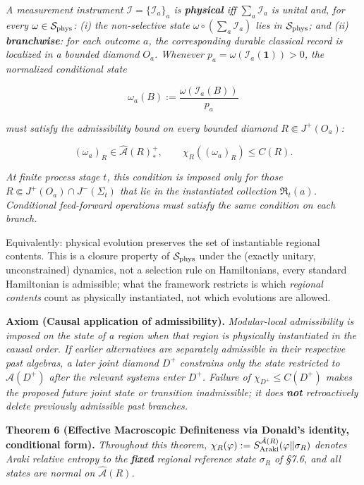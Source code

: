 \documentclass[11pt,a4paper]{article}
\begin{document}
\emph{A measurement instrument $\mathcal{I} = \{\mathcal{I}_a\}_a$ is \textbf{physical} iff $\sum_a \mathcal{I}_a$ is unital and, for every $\omega \in \mathcal{S}_{\rm phys}$:}
\emph{(i) the non-selective state $\omega \circ (\sum_a \mathcal{I}_a)$ lies in $\mathcal{S}_{\rm phys}$; and}
\emph{(ii) \textbf{branchwise}: for each outcome $a$, the corresponding durable classical record is localized in a bounded diamond $O_a$. Whenever $p_a = \omega(\mathcal{I}_a(\mathbf{1})) > 0$, the normalized conditional state}

\[
\omega_a(B) := \frac{\omega(\mathcal{I}_a(B))}{p_a}
\]

\emph{must satisfy the admissibility bound on every bounded diamond $R \Subset J^+(O_a)$:}

\[
(\omega_a)_R \in \hat{\mathcal{A}}(R)_*^+, \qquad \chi_R((\omega_a)_R) \le C(R).
\]

\emph{At finite process stage $t$, this condition is imposed only for those $R \Subset J^+(O_a) \cap J^-(\Sigma_t)$ that lie in the instantiated collection $\mathfrak{R}_t(a)$. Conditional feed-forward operations must satisfy the same condition on each branch.}

Equivalently: physical evolution preserves the set of instantiable regional contents. This is a closure property of $\mathcal{S}_{\rm phys}$ under the (exactly unitary, unconstrained) dynamics, not a selection rule on Hamiltonians, every standard Hamiltonian is admissible; what the framework restricts is which \emph{regional contents} count as physically instantiated, not which evolutions are allowed.

\textbf{Axiom (Causal application of admissibility).} \emph{Modular-local admissibility is imposed on the state of a region when that region is physically instantiated in the causal order. If earlier alternatives are separately admissible in their respective past algebras, a later joint diamond $D^+$ constrains only the state restricted to $\hat{\mathcal{A}}(D^+)$ after the relevant systems enter $D^+$. Failure of $\chi_{D^+} \le C(D^+)$ makes the proposed future joint state or transition inadmissible; it does \textbf{not} retroactively delete previously admissible past branches.}

\textbf{Theorem 6 (Effective Macroscopic Definiteness via Donald's identity, conditional form).} \emph{Throughout this theorem, $\chi_R(\varphi) := S_{\rm Araki}^{\hat{\mathcal{A}}(R)}(\varphi \| \sigma_R)$ denotes Araki relative entropy to the \textbf{fixed} regional reference state $\sigma_R$ of §7.6, and all states are normal on $\hat{\mathcal{A}}(R)$.}
\end{document}
